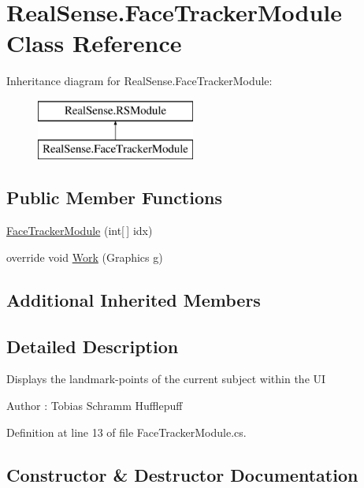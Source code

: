 \hypertarget{class_real_sense_1_1_face_tracker_module}{}\section{Real\+Sense.\+Face\+Tracker\+Module Class Reference}
\label{class_real_sense_1_1_face_tracker_module}
Inheritance diagram for Real\+Sense.\+Face\+Tracker\+Module\+:\begin{figure}[H]
\begin{center}
\leavevmode
\includegraphics[height=2.000000cm]{class_real_sense_1_1_face_tracker_module}
\end{center}
\end{figure}
\subsection*{Public Member Functions}
\begin{DoxyCompactItemize}
\item 
\hyperlink{class_real_sense_1_1_face_tracker_module_ac34dc667e54a0a222f750f27f71734c4}{Face\+Tracker\+Module} (int\mbox{[}$\,$\mbox{]} idx)
\item 
override void \hyperlink{class_real_sense_1_1_face_tracker_module_a38b7097ab671999aae5f1a645fc623f8}{Work} (Graphics g)
\end{DoxyCompactItemize}
\subsection*{Additional Inherited Members}


\subsection{Detailed Description}
Displays the landmark-\/points of the current subject within the UI \begin{DoxyAuthor}{Author}
\+: Tobias Schramm  Hufflepuff 
\end{DoxyAuthor}


Definition at line 13 of file Face\+Tracker\+Module.\+cs.



\subsection{Constructor \& Destructor Documentation}
\mbox{\label{class_real_sense_1_1_face_tracker_module_ac34dc667e54a0a222f750f27f71734c4}} 
